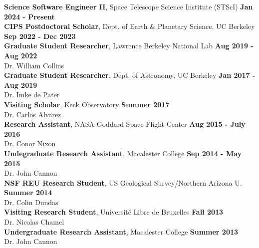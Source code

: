 \documentclass[margin, 10pt]{res} %
\newcommand\tab[1][1cm]{\hspace*{#1}}
\begin{document}
\begin{resume}
{\bf Science Software Engineer II}, Space Telescope Science Institute (STScI) \hfill {\bf
  Jan 2024 - Present} \\
{\bf CIPS Postdoctoral Scholar}, Dept. of Earth \& Planetary Science, UC Berkeley \hfill {\bf
  Sep 2022 - Dec 2023} \\
{\bf Graduate Student Researcher}, Lawrence Berkeley National Lab \hfill {\bf
  Aug 2019 - Aug 2022} \\
 \tab {\it Adviser:} Dr. William Collins \\
{\bf Graduate Student Researcher}, Dept. of Astronomy, UC Berkeley \hfill {\bf
  Jan 2017 - Aug 2019} \\
\tab {\it Adviser:} Dr. Imke de Pater \\
{\bf Visiting Scholar}, Keck Observatory \hfill {\bf
  Summer 2017} \\
\tab {\it Adviser:} Dr. Carlos Alvarez \\
{\bf Research Assistant}, NASA Goddard Space Flight Center \hfill {\bf
  Aug 2015 - July 2016} \\
\tab {\it Adviser:} Dr. Conor Nixon \\
{\bf Undegraduate Research Assistant}, Macalester College \hfill {\bf Sep
2014 - May 2015} \\
\tab {\it Adviser:} Dr. John Cannon \\
{\bf NSF REU Research Student}, US Geological Survey/Northern Arizona U. \hfill {\bf Summer 2014} \\
\tab {\it Adviser:} Dr. Colin Dundas \\
{\bf Visiting Research Student}, Universit\'e Libre de Bruxelles
\hfill {\bf Fall 2013} \\
\tab {\it Adviser:} Dr. Nicolas Chamel \\
{\bf Undergraduate Research Assistant}, Macalester College \hfill
{\bf Summer 2013} \\
\tab {\it Adviser:} Dr. John Cannon \\




\end{resume}
\end{document}
